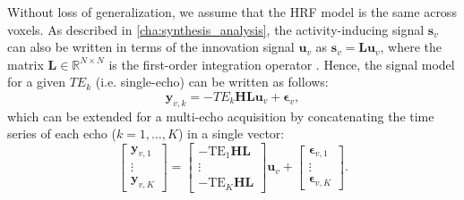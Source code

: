 Without loss of generalization, we assume that the HRF model is the same across
voxels. As described in \cref{cha:synthesis_analysis}, the activity-inducing
signal $\mathbf{s}_{v}$ can also be written in terms of the innovation signal
$\mathbf{u}_v$ as $\mathbf{s}_{v} = \mathbf{Lu}_{v}$, where the matrix
$\mathbf{L} \in \mathbb{R}^{N \times N}$ is the first-order integration operator
\citep{Cherkaoui2019Sparsitybasedblind,
Urunuela2020StabilityBasedSparse,Urunuela2023HemodynamicDeconvolutionDemystified}.
Hence, the signal model for a given $TE_k$ (i.e. single-echo) can be written as
follows:
\begin{equation}
\label{eq:signal_model_single_echo}
    \mathbf{y}_{v,k} = - TE_{k} \mathbf{HL} \mathbf{u}_{v} + \boldsymbol{\epsilon}_v,
\end{equation}
which can be extended for a multi-echo acquisition by concatenating the time
series of each echo ($k=1,\ldots,K$) in a single vector:
\begin{equation}
\label{eq:signal_model_multi_echo}
\left[\begin{array}{c} \mathbf{y}_{v,1} \\
    \vdots \\
    \mathbf{y}_{v,K} 
\end{array}\right]
=
\left[\begin{array}{c} -\mathrm{TE}_{1} \mathbf{HL} \\
    \vdots \\
    -\mathrm{TE}_{K} \mathbf{HL}
\end{array}\right]
\mathbf{u}_v
+
\left[\begin{array}{c} \boldsymbol{\epsilon}_{v,1} \\
    \vdots  \\
    \boldsymbol{\epsilon}_{v,K}
\end{array}\right].
\end{equation}

